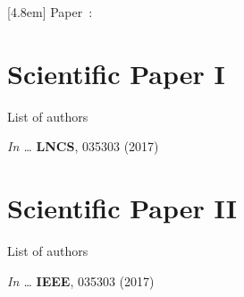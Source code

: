 \renewcommand{\appendixname}{PAPER} %

  [4.8em]%
  {\vspace*{1em}\bfseries\normalsize}%
  {\hspace*{-4.8em}Paper\ \thecontentslabel:\quad}%
  {}%
  {\normalsize\hfill\contentspage}%

\fancyhf{}   %
\fancyhead{} %
\renewcommand{\headrulewidth}{0pt} %
\renewcommand{\chaptitlefont}{\bfseries\Large}


\chapter{Scientific Paper I}

\noindent List of authors\vspace{3ex}

\noindent \textit{In \Proc \IntlConf \ldots} \textbf{LNCS}, 035303 (2017)
\cleardoublepage



\chapter{Scientific Paper II}

\noindent List of authors\vspace{3ex}

\noindent \textit{In \Proc \IntlConf \ldots} \textbf{IEEE}, 035303 (2017)
\cleardoublepage





